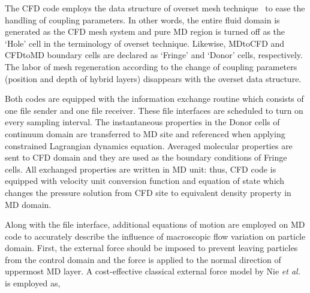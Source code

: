 \documentclass[preprint,12pt]{elsarticle}
\newcommand{\skonote}[1]{ {\textcolor{blue} { ***Jeff: #1 }}}
\newcommand{\skonote}[1]{}
\begin{document}
The CFD code employs the data structure of overset mesh technique~\cite{Chimera} to ease the handling of coupling parameters. In other words, the entire fluid domain is generated as the CFD mesh system and pure MD region is turned off as the `Hole' cell in the terminology of overset technique. Likewise, MDtoCFD and CFDtoMD boundary cells are declared as `Fringe' and `Donor' cells, respectively. The labor of mesh regeneration according to the change of coupling parameters (position and depth of hybrid layers) disappears with the overset data structure.

Both codes are equipped with the information exchange routine which consists of one file sender and one file receiver. These file interfaces are scheduled to turn on every sampling interval. The instantaneous properties in the Donor cells of continuum domain are transferred to MD site and referenced when applying constrained Lagrangian dynamics equation. Averaged molecular properties are sent to CFD domain and they are used as the boundary conditions of Fringe cells. All exchanged properties are written in MD unit: thus, CFD code is equipped with velocity unit conversion function and equation of state which changes the pressure solution from CFD site to equivalent density property in MD domain.

Along with the file interface, additional equations of motion are employed on MD code to accurately describe the influence of macroscopic flow variation on particle domain. First, the external force should be imposed to prevent leaving particles from the control domain and the force is applied to the normal direction of uppermost MD layer. A cost-effective classical external force model by Nie {\it{et al.}}~\cite{Nie} is employed as,

\end{document}
